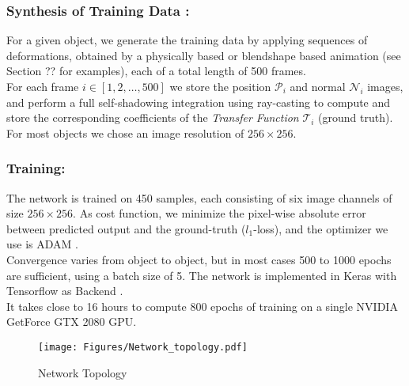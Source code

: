 \subsubsection*{Synthesis of Training Data :\\}
For a given object, we generate the training data by applying sequences of  deformations, obtained by a physically based or blendshape based animation (see Section ?? for examples), each of a total length of 500 frames. 
\\
For each frame $i \in [1,2,\dots,500]$ we store the position $\mathcal{P}_i$  and normal $\mathcal{N}_i$ images, and perform a full self-shadowing integration using ray-casting to compute and store the corresponding coefficients of the \textit{Transfer Function} $\mathcal{T}_i$ (ground truth).
\\
For most objects we chose an image resolution of $256 \times 256$. 

\subsubsection*{Training: \\} 
The network is trained on 450 samples, each consisting of six image channels of size $256 \times 256$. As cost function, we minimize the pixel-wise absolute error between predicted output and the ground-truth ($l_1$-loss), and the optimizer we use is ADAM \cite{ADAM}. 
\\
Convergence varies from object to object, but in most cases 500 to 1000 epochs are sufficient, using a batch size of 5. The network is implemented in Keras with Tensorflow as Backend \cite{Keras}. 
\\
It takes close to 16 hours to compute 800 epochs of training on a single NVIDIA GetForce GTX 2080 GPU.

\begin{figure*}[t]
  \centering
    \texttt{[image: Figures/Network\_topology.pdf]}
     \caption{Network Topology}
     \label{Fig: NetworkTopology}
\end{figure*}

  


